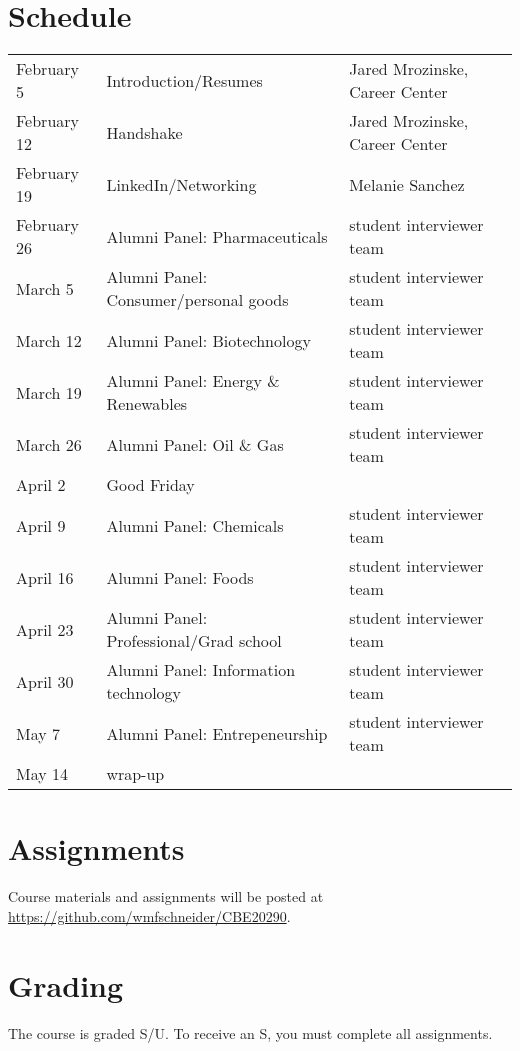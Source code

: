 \documentclass[11pt]{article}
\begin{document}
\section{Schedule}
\label{sec:orgd96c0dc}
\begin{center}
\begin{tabular}{lll}
February 5 & Introduction/Resumes & Jared Mrozinske, Career Center\\
February 12 & Handshake & Jared Mrozinske, Career Center\\
February 19 & LinkedIn/Networking & Melanie Sanchez\\
February 26 & Alumni Panel: Pharmaceuticals & student interviewer team\\
March 5 & Alumni Panel: Consumer/personal goods & student interviewer team\\
March 12 & Alumni Panel: Biotechnology & student interviewer team\\
March 19 & Alumni Panel: Energy \& Renewables & student interviewer team\\
March 26 & Alumni Panel: Oil \& Gas & student interviewer team\\
April 2 & Good Friday & \\
April 9 & Alumni Panel: Chemicals & student interviewer team\\
April 16 & Alumni Panel: Foods & student interviewer team\\
April 23 & Alumni Panel: Professional/Grad school & student interviewer team\\
April 30 & Alumni Panel: Information technology & student interviewer team\\
May 7 & Alumni Panel: Entrepeneurship & student interviewer team\\
May 14 & wrap-up & \\
\end{tabular}
\end{center}

\section{Assignments}
\label{sec:org39583bd}
Course materials and assignments will be posted at  \url{https://github.com/wmfschneider/CBE20290}.

\section{Grading}
\label{sec:org1d069f4}
The course is graded S/U. To receive an S, you must complete all assignments.
\end{document}
